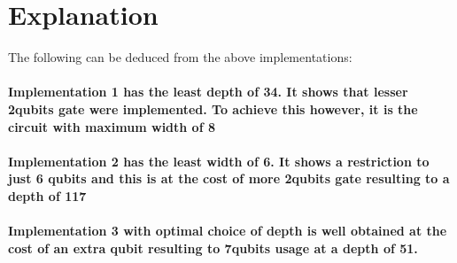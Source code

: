 \documentclass[12pt, letterpaper]{article}
\begin{document}
\newpage
\section{
Explanation
}
The following can be deduced from the above implementations:
\paragraph{
Implementation 1 has the least depth of 34. It shows that lesser 2qubits gate were implemented. To achieve this however, it is the circuit with maximum width of 8}
\paragraph{
Implementation 2 has the least width of 6. It shows a restriction to just 6 qubits and this is at the cost of more 2qubits gate resulting to a depth of 117}
\paragraph{
Implementation 3 with optimal choice of depth is well obtained at the cost of an extra qubit resulting to 7qubits usage at a depth of 51.}
\end{document}
